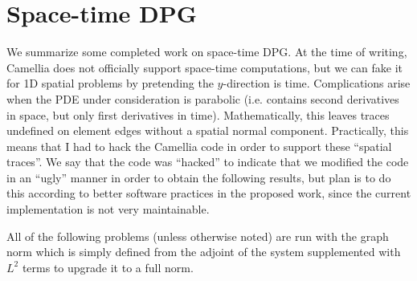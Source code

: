 \documentclass[Proposal.tex]{subfiles}
\begin{document}
\chapter{Space-time DPG}
We summarize some completed work on space-time DPG. At the time of writing, Camellia does not officially support space-time computations, but we can fake it for 1D spatial problems by pretending the $y$-direction is time.
Complications arise when the PDE under consideration is parabolic (i.e. contains second derivatives in space, but only first derivatives in time). 
Mathematically, this leaves traces undefined on element edges without a spatial normal component. 
Practically, this means that I had to hack the Camellia code in order to support these ``spatial traces''.
We say that the code was ``hacked'' to indicate that we modified the code in an ``ugly'' manner in order to obtain the following results, 
but plan is to do this according to better software practices in the proposed work, since the current implementation is not very maintainable.

All of the following problems (unless otherwise noted) are run with the graph norm which is
simply defined from the adjoint of the system supplemented with $L^2$ terms to upgrade it to a full norm.

\end{document}
